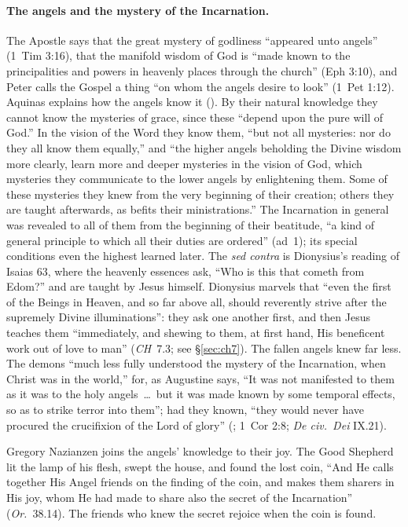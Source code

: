 \paragraph{The angels and the mystery of the Incarnation.} The Apostle says
that the great mystery of godliness ``appeared unto angels'' (1~Tim 3:16),
that the manifold wisdom of God is ``made known to the principalities and
powers in heavenly places through the church'' (Eph 3:10), and Peter calls
the Gospel a thing ``on whom the angels desire to look'' (1~Pet 1:12).
Aquinas explains how the angels know it (). By their
natural knowledge they cannot know the mysteries of grace, since these
``depend upon the pure will of God.'' In the vision of the Word they know
them, ``but not all mysteries: nor do they all know them equally,'' and ``the
higher angels beholding the Divine wisdom more clearly, learn more and
deeper mysteries in the vision of God, which mysteries they communicate to
the lower angels by enlightening them. Some of these mysteries they knew
from the very beginning of their creation; others they are taught
afterwards, as befits their ministrations.'' The Incarnation in general was
revealed to all of them from the beginning of their beatitude, ``a kind of
general principle to which all their duties are ordered'' (ad~1); its
special conditions even the highest learned later. The \emph{sed contra} is
Dionysius's reading of Isaias 63, where the heavenly essences ask, ``Who is
this that cometh from Edom?'' and are taught by Jesus himself. Dionysius
marvels that ``even the first of the Beings in Heaven, and so far above
all, should reverently strive after the supremely Divine illuminations'':
they ask one another first, and then Jesus teaches them ``immediately, and
shewing to them, at first hand, His beneficent work out of love to man''
(\emph{CH}~7.3; see \S\ref{sec:ch7}). The fallen angels knew far less. The
demons ``much less fully understood the mystery of the Incarnation, when
Christ was in the world,'' for, as Augustine says, ``It was not manifested
to them as it was to the holy angels~\dots\ but it was made known by some
temporal effects, so as to strike terror into them''; had they known,
``they would never have procured the crucifixion of the Lord of glory''
(; 1~Cor 2:8; \emph{De civ.\ Dei} IX.21).

Gregory Nazianzen joins the angels' knowledge to their joy. The Good
Shepherd lit the lamp of his flesh, swept the house, and found the lost
coin, ``And He calls together His Angel friends on the finding of the coin,
and makes them sharers in His joy, whom He had made to share also the
secret of the Incarnation'' (\emph{Or.}\ 38.14). The friends who knew the
secret rejoice when the coin is found.

